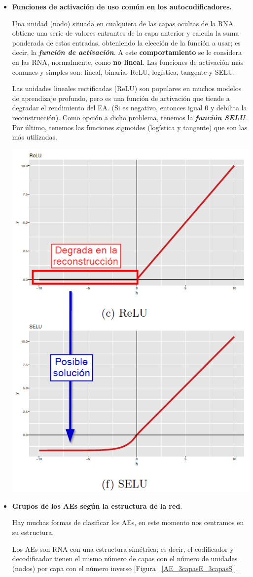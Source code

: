 \begin{enumerate}
\begin{itemize}
        \item \textbf{Funciones de activación de uso común en los autocodificadores.}
            \par Una unidad (nodo) situada en cualquiera de las capas ocultas de la RNA obtiene una serie de valores entrantes de la capa anterior y calcula la suma ponderada de estas entradas, obteniendo la elección de la función a usar; es decir, la \textit{\textbf{función de activación}}. A este \textbf{comportamiento} se le considera en las RNA, normalmente, como \textbf{no lineal}.
            Las funciones de activación más comunes y simples son: lineal, binaria, ReLU, logística, tangente y SELU. 
            
            \smallskip
            Las unidades lineales rectificadas (ReLU) son populares en muchos modelos de aprendizaje profundo, pero es una función de activación que tiende a degradar el rendimiento del EA. (Si es negativo, entonces igual 0 y debilita la reconstrucción). Como opción a dicho problema, tenemos la \textit{\textbf{función SELU}}. Por último, tenemos las funciones sigmoides (logística y tangente) que son las más utilizadas.
            
            \begin{center}
                \includegraphics[width=.4\textwidth]{imagenes/Funciones_activacion_ReLU_SELU.png}
            \end{center}
            
        \item \textbf{Grupos de los AEs según la estructura de la red}.
        \par Hay muchas formas de clasificar los AEs, en este momento nos centramos en su estructura.
        
        Los AEs son RNA con una estructura simétrica; es decir, el codificador y decodificador tienen el mismo número de capas con el número de unidades (nodos) por capa con el número inverso [Figura ~\ref{AE_3capasE_3capasS}]. 
        

\end{itemize}
\end{enumerate}
